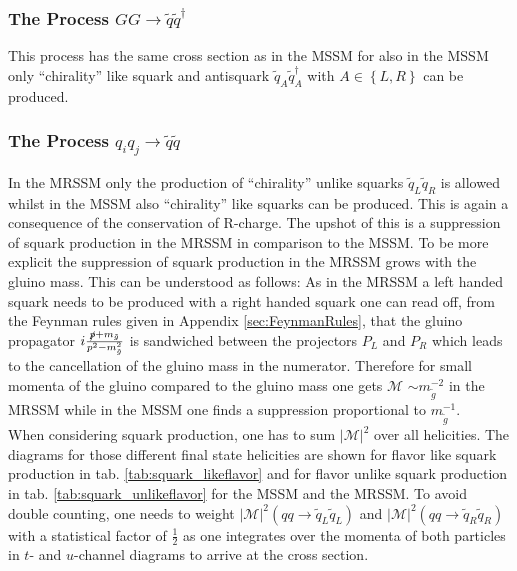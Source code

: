 \subsubsection*{The Process $GG \to \tilde{q}\tilde{q}^\dagger$}
This process has the same cross section as in the MSSM for also in the MSSM only ``chirality'' like squark and antisquark $\tilde{q}_A\tilde{q}_A^\dagger$ with $A \in \left\{L,R\right\}$ can be produced. 

\subsubsection*{The Process $q_i q_j \to \tilde{q}\tilde{q}$}
In the MRSSM only the production of ``chirality'' unlike squarks $\tilde{q}_L \tilde{q}_R$ is allowed whilst in the MSSM also ``chirality'' like squarks can be produced. This is again a consequence of the conservation of R-charge. The upshot of this is a suppression of squark production in the MRSSM in comparison to the MSSM. To be more explicit the suppression of squark production in the MRSSM grows with the gluino mass. This can be understood as follows: As in the MRSSM a left handed squark needs to be produced with a right handed squark one can read off, from the Feynman rules given in Appendix \ref{sec:FeynmanRules}, that the gluino propagator $i\frac{\slashed{p}+m_{\tilde{g}}}{p^2-m_{\tilde{g}}^2}$ is sandwiched between the projectors $P_L$ and $P_R$ which leads to the cancellation of the gluino mass in the numerator. Therefore for small momenta of the gluino compared to the gluino mass one gets $\mathcal{M}$ $\sim m_{\tilde{g}}^{-2}$ in the MRSSM while in the MSSM one finds a suppression proportional to $m_{\tilde{g}}^{-1}$.\\
When considering squark production, one has to sum $|\mathcal{M}|^2$ over all helicities. The diagrams for those different final state helicities are shown for flavor like squark production in tab. \ref{tab:squark_likeflavor} and for flavor unlike squark production in tab. \ref{tab:squark_unlikeflavor} for the MSSM and the MRSSM. To avoid double counting, one needs to weight $|\mathcal{M}|^2(qq\to \tilde{q}_L\tilde{q}_L)$ and $|\mathcal{M}|^2(qq\to \tilde{q}_R\tilde{q}_R)$ with a statistical factor of $\frac{1}{2}$ as one integrates over the momenta of both particles in $t$- and $u$-channel diagrams to arrive at the cross section.
